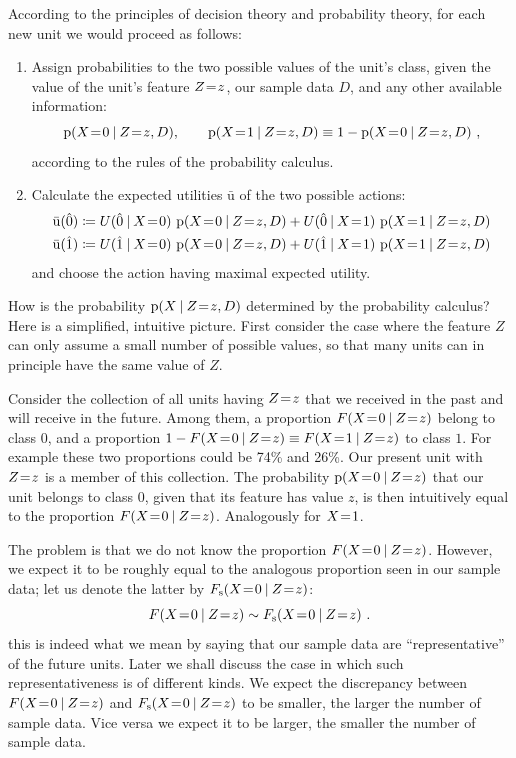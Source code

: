 \documentclass[\ifafour a4paper,12pt,\else a5paper,10pt,\fi%
onecolumn,oneside,article,%
british%
]{memoir}
\theoremstyle{remark}
\theoremstyle{innote}
\newcommand*{\defd}{\coloneqq}
\newcommand*{\p}{\mathrm{p}}%
\renewcommand*{\|}[1][]{\nonscript\:#1\vert\nonscript\:\mathopen{}}
\newcommand*{\mo}[1][=]{\mathrel{\mkern-3.5mu#1\mkern-3.5mu}}
\newcommand*{\Fs}{F_{\textrm{s}}}
\newcommand*{\za}{\hat{0}}
\newcommand*{\zb}{\hat{1}}
\newcommand*{\U}{\mathrm{u}}
\newcommand*{\eu}{\bar{\U}}
\begin{document}
According to the principles of decision theory and probability theory, for each new unit we would proceed as follows:
\begin{enumerate}[label=\arabic*.]
\item Assign probabilities to the two possible values of the unit's class, given the value of the unit's feature $Z\mo z$, our sample data $D$, and any other available information:
  \begin{equation}
    \p(X\mo 0 \| Z\mo z, D), \qquad \p(X\mo 1 \| Z\mo z,D) \equiv 1- \p(X\mo 0 \| Z\mo z,D) \ ,
  \end{equation}
  according to the rules of the probability calculus.
\item Calculate the expected utilities $\eu$ of the two possible actions:
  \begin{equation}
    \begin{aligned}
      \eu(\za) &\defd U(\za \| X\mo 0) \ 
                 \p(X\mo 0 \| Z\mo z, D) + U(\za \| X\mo 1) \ 
                 \p(X\mo 1 \| Z\mo z, D)
      \\
      \eu(\zb) &\defd U(\zb \| X\mo 0) \ 
                 \p(X\mo 0 \| Z\mo z, D) + U(\zb \| X\mo 1) \ 
                 \p(X\mo 1 \| Z\mo z, D)
    \end{aligned}
\end{equation}
  and choose the action having maximal expected utility.
\end{enumerate}

\medskip

How is the probability $\p(X \| Z\mo z, D)$ determined by the probability calculus? Here is a simplified, intuitive picture. First consider the case where the feature $Z$ can only assume a small number of possible values, so that many units can in principle have the same value of $Z$.

Consider the collection of all units having $Z\mo z$ that we received in the past and will receive in the future. Among them, a proportion $F(X\mo 0 \| Z\mo z)$ belong to class $0$, and a proportion $1 - F(X\mo 0 \| Z\mo z) \equiv F(X\mo 1 \| Z\mo z)$ to class $1$. For example these two proportions could be 74\% and 26\%. Our present unit with $Z\mo z$ is a member of this collection. The probability $\p(X\mo 0 \| Z\mo z)$ that our unit belongs to class $0$, given that its feature has value $z$, is then intuitively equal to the proportion $F(X\mo 0 \| Z\mo z)$. Analogously for $X\mo 1$.

The problem is that we do not know the proportion $F(X\mo 0 \| Z\mo z)$. However, we expect it to be roughly equal to the analogous proportion seen in our sample data; let us denote the latter by $\Fs(X\mo 0 \| Z\mo z)$:
\begin{equation}
  \label{eq:approx_repres}
  F(X\mo 0 \| Z\mo z) \sim \Fs(X\mo 0 \| Z\mo z) \ .
\end{equation}
this is indeed what we mean by saying that our sample data are \enquote{representative} of the future units. Later we shall discuss the case in which such representativeness is of different kinds. We expect the discrepancy between $F(X\mo 0 \| Z\mo z)$ and $\Fs(X\mo 0 \| Z\mo z)$ to be smaller, the larger the number of sample data. Vice versa we expect it to be larger, the smaller the number of sample data.
\end{document}
